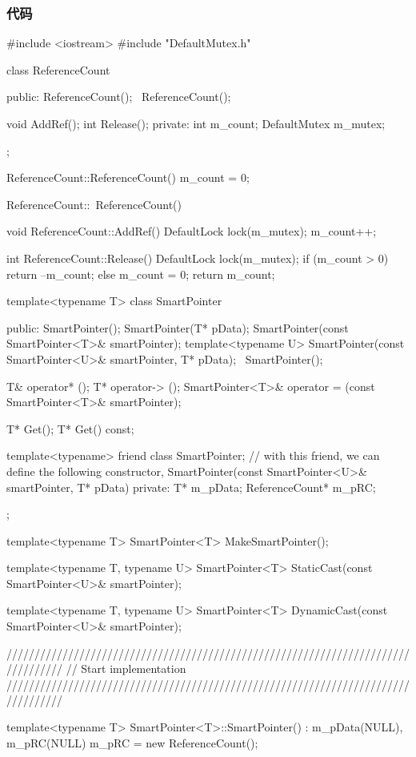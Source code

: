 \subsubsection{代码}
\begin{Code}
#include <iostream>
#include "DefaultMutex.h"

class ReferenceCount
{
 public:
    ReferenceCount();
    ~ReferenceCount();

    void AddRef();
    int Release();
 private:
    int m_count;
    DefaultMutex m_mutex;
};

ReferenceCount::ReferenceCount()
{
    m_count = 0;
}

ReferenceCount::~ReferenceCount()
{
}

void ReferenceCount::AddRef()
{
    DefaultLock lock(m_mutex);
    m_count++;
}

int ReferenceCount::Release()
{
    DefaultLock lock(m_mutex);
    if (m_count > 0)
    {
        return --m_count;
    }
    else
    {
        m_count = 0;
        return m_count;
    }
}

template<typename T>
class SmartPointer
{
 public:
    SmartPointer();
    SmartPointer(T* pData);
    SmartPointer(const SmartPointer<T>& smartPointer);
    template<typename U>
        SmartPointer(const SmartPointer<U>& smartPointer, T* pData);
    ~SmartPointer();

    T& operator* ();
    T* operator-> ();
    SmartPointer<T>& operator = (const SmartPointer<T>& smartPointer);

    T* Get();
    T* Get() const;

    template<typename> friend class SmartPointer; // with this friend, we can define the following constructor, SmartPointer(const SmartPointer<U>& smartPointer, T* pData)
 private:
    T* m_pData;
    ReferenceCount* m_pRC;
};

template<typename T>
SmartPointer<T> MakeSmartPointer();

template<typename T, typename U>
    SmartPointer<T> StaticCast(const SmartPointer<U>& smartPointer);

template<typename T, typename U>
    SmartPointer<T> DynamicCast(const SmartPointer<U>& smartPointer);

//////////////////////////////////////////////////////////////////////////////////
// Start implementation
//////////////////////////////////////////////////////////////////////////////////

template<typename T>
SmartPointer<T>::SmartPointer()
    : m_pData(NULL), m_pRC(NULL)
{
    m_pRC = new ReferenceCount();
}


\end{Code}
